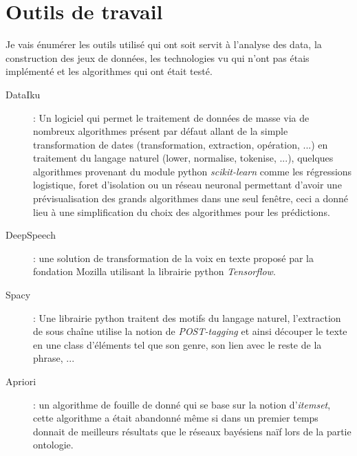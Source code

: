 \section{Outils de travail}
Je vais énumérer les outils utilisé qui ont soit servit à l'analyse des data, la construction des jeux de données, les technologies vu qui n'ont pas étais implémenté et les algorithmes qui ont était testé.\\
\linebreak
\begin{description}
\item[DataIku]: Un logiciel qui permet le traitement de données de masse via de nombreux algorithmes présent par défaut allant de la simple transformation de dates (transformation, extraction, opération, ...) en traitement du langage naturel (lower, normalise, tokenise, ...), quelques algorithmes provenant du module python \textit{scikit-learn} comme les régressions logistique, foret d'isolation ou un réseau neuronal permettant d'avoir une prévisualisation des grands algorithmes dans une seul fenêtre, ceci a donné lieu à une simplification du choix des algorithmes pour les prédictions.
\item[DeepSpeech]: une solution de transformation de la voix en texte proposé par la fondation Mozilla utilisant la librairie python \textit{Tensorflow}.
\item[Spacy]: Une librairie python traitent des motifs du langage naturel, l'extraction de sous chaîne utilise la notion de \textit{POST-tagging} et ainsi découper le texte en une class d'éléments tel que son genre, son lien avec le reste de la phrase, ...
\item[Apriori]: un algorithme de fouille de donné qui se base sur la notion d'\textit{itemset}, cette algorithme a était abandonné même si dans un premier temps donnait de meilleurs résultats que le réseaux bayésiens naïf lors de la partie ontologie.
\end{description}

\pagebreak
